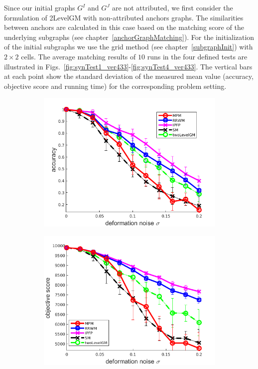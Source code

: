 Since our initial graphs $G^I$ and $G^J$ are not attributed, we first consider the formulation of 2LevelGM with non-attributed anchors graphs. The similarities between anchors are calculated in this case based on the matching score of the underlying subgraphs (see chapter~\ref{anchorGraphMatching}). For the initialization of the initial subgraphs we use the grid method (see chapter~\ref{subgraphInit}) with $2\times 2$ cells. The average matching results of $10$ runs in the four defined tests are illustrated in Figs.~\ref{fig:synTest1_ver433}-\ref{fig:synTest4_ver433}. The vertical bars at each point show the standard deviation of the measured mean value (accuracy, objective score and running time) for the corresponding problem setting.
\begin{figure}
	\begin{subfigure}[b]{0.33\textwidth}
		\centering
		\includegraphics[scale=0.25]{"chapter3/fig/SyntheticTest/no_descr/Results_v4.3.3/Test2/accuracy_avg10t"} 
	\end{subfigure}
	\begin{subfigure}[b]{0.33\textwidth}
		\centering
		\includegraphics[scale=0.25]{"chapter3/fig/SyntheticTest/no_descr/Results_v4.3.3/Test2/score_avg10t"} 

\end{subfigure}
\end{figure}
